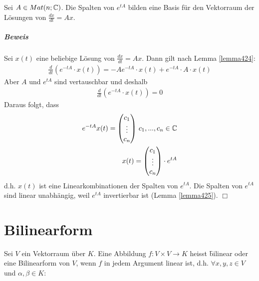 \begin{satz} %
\label{satz426}
Sei $A \in Mat(n; \mathbb{C})$. Die Spalten von $e^{t A}$ bilden eine Basis für den Vektorraum der Lösungen von $\frac{dx}{dt} = Ax$.
\end{satz}


\paragraph{Beweis}
Sei $x(t)$ eine beliebige Lösung von $\frac{dx}{dt} = Ax$. Dann gilt nach Lemma \ref{lemma424}:
\begin{align}
\frac{d}{dt} \left( e^{-tA}\cdot x(t)\right) = -A e^{-tA} \cdot x(t) + e^{-tA} \cdot A \cdot x(t)
\end{align}
Aber $A$ und $e^{tA}$ sind vertauschbar und deshalb
\begin{align}
\frac{d}{dt}\left( e^{-tA} \cdot x(t) \right) = 0
\end{align}
Daraus folgt, dass 
\begin{align}
e^{-tA} x(t) =  \begin{pmatrix} c_1 \\ \vdots \\ c_n \end{pmatrix}\, c_1, ..., c_n \in \mathbb{C} \\
x(t) = \begin{pmatrix} c_1 \\ \vdots \\ c_n \end{pmatrix} \cdot e^{tA}
\end{align}
d.h. $x(t)$ ist eine Linearkombinationen der Spalten von $e^{tA}$. Die Spalten von $e^{tA}$ sind linear unabhängig, weil $e^{tA}$ invertierbar ist (Lemma \ref{lemma425}). \hfill $\Box$

\chapter{Bilinearform} %
Sei $V$ ein Vektorraum über $K$. Eine Abbildung $f: V \times V \rightarrow K$ heisst \f{bilinear} oder eine Bilinearform von $V$, wenn $f$ in jedem Argument linear ist, d.h. $\forall x, y, z \in V$ und $\alpha, \beta \in K$:

